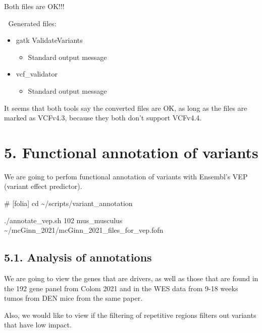 \documentclass[
  letterpaper,
  DIV=11,
  numbers=noendperiod]{scrreprt}
\newenvironment{Shaded}{\begin{snugshade}}{\end{snugshade}}
\newcommand{\BuiltInTok}[1]{\textcolor[rgb]{0.00,0.23,0.31}{#1}}
\newcommand{\CommentTok}[1]{\textcolor[rgb]{0.37,0.37,0.37}{#1}}
\newcommand{\ExtensionTok}[1]{\textcolor[rgb]{0.00,0.23,0.31}{#1}}
\newcommand{\NormalTok}[1]{\textcolor[rgb]{0.00,0.23,0.31}{#1}}
\providecommand{\tightlist}{%
  \setlength{\itemsep}{0pt}\setlength{\parskip}{0pt}}\usepackage{longtable,booktabs,array}
\begin{document}
Both files are OK!!!

📁 Generated files:

\begin{itemize}
\tightlist
\item
  gatk ValidateVariants

  \begin{itemize}
  \tightlist
  \item
    Standard output message
  \end{itemize}
\item
  vcf\_validator

  \begin{itemize}
  \tightlist
  \item
    Standard output message
  \end{itemize}
\end{itemize}

It seems that both tools say the converted files are OK, as long as the
files are marked as VCFv4.3, because they both don't support VCFv4.4.

\chapter{5. Functional annotation of
variants}\label{functional-annotation-of-variants}

We are going to perfom functional annotation of variants with Ensembl's
VEP (variant effect predictor).

\begin{Shaded}
\begin{Highlighting}[]
\CommentTok{\# [folia]}
\BuiltInTok{cd}\NormalTok{ \textasciitilde{}/scripts/variant\_annotation}

\ExtensionTok{./annotate\_vep.sh}\NormalTok{ 102 mus\_musculus \textasciitilde{}/mcGinn\_2021/mcGinn\_2021\_files\_for\_vep.fofn}
\end{Highlighting}
\end{Shaded}

\section{5.1. Analysis of annotations}\label{analysis-of-annotations}

We are going to view the genes that are drivers, as well as those that
are found in the 192 gene panel from Colom 2021 and in the WES data from
9-18 weeks tumos from DEN mice from the same paper.

Also, we would like to view if the filtering of repetitive regions
filters out variants that have low impact.
\end{document}
